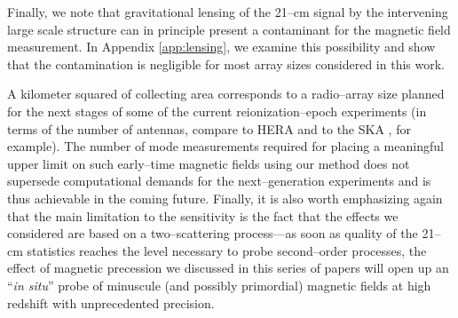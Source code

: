 Finally, we note that gravitational lensing of the 21--cm signal by the intervening large scale structure can in principle present a contaminant for the magnetic field measurement. In Appendix \ref{app:lensing}, we examine this possibility and show that the contamination is negligible for most array sizes considered in this work. %

A kilometer squared of collecting area corresponds to a radio--array size planned for the next stages of some of the current reionization--epoch experiments (in terms of the number of antennas, compare to HERA and to the SKA \cite{2008arXiv0802.1727C}, for example). The number of mode measurements required for placing a meaningful upper limit on such early--time magnetic fields using our method does not supersede computational demands for the next--generation  experiments and is thus achievable in the coming future. Finally, it is also worth emphasizing again that the main limitation to the sensitivity is the fact that the effects we considered are based on a two--scattering process---as soon as quality of the 21--cm statistics reaches the level necessary to probe second--order processes, the effect of magnetic precession we discussed in this series of papers will open up an ``\textit{in situ}'' probe of minuscule (and possibly primordial) magnetic fields at high redshift with unprecedented precision. 

  